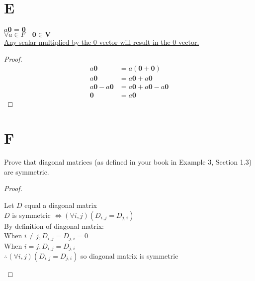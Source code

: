 \documentclass[11pt]{scrartcl}
\makeatletter
\newenvironment{Dequation}
  {%
  \def\tagform@##1{%
    \maketag@@@{\makebox[0pt][r]{(\ignorespaces##1\unskip\@@italiccorr)}}}%
  \ignorespaces
  }
  {%
  \def\tagform@##1{\maketag@@@{(\ignorespaces##1\unskip\@@italiccorr)}}%
  \ignorespacesafterend
  }
\makeatother
\begin{document}
\section{E}
\begin{theorem*}
			{$a\textbf{0 = 0}$ \\ $\forall a \in F \quad \textbf{0} \in \textbf{V}$ \\ \ul{Any scalar multiplied by the 0 vector will result in the 0 vector.}}
\end{theorem*}
\begin{proof}
\begin{Dequation}
\begin{align*}
	a \textbf{0} & = a(\textbf{0} + \textbf{0}) \tag{Identity element of addition} \\ 
	a \textbf{0} & = a\textbf{0} + a\textbf{0} \tag{Distributive} \\ 
	a \textbf{0} - a \textbf{0} & = a\textbf{0} + a\textbf{0} - a\textbf{0} \tag{Inverse element of addition} \\ 
	\textbf{0} & = a \textbf{0}
\end{align*}
\end{Dequation}
\end{proof}

\section{F}
Prove that diagonal matrices (as defined in your book in Example 3, Section 1.3) are symmetric.

\begin{proof}
	\-\
	\begin{center}
	Let $D$ equal a diagonal matrix \\
	$D$ is symmetric $\Leftrightarrow (\forall i,j)(D_{i,j} = D_{j,i})$\\
	By definition of diagonal matrix:\\
	When $i \neq j, D_{i,j} = D_{j,i} = 0$\\
	When $i = j, D_{i,j} = D_{j,i}$\\
	$\therefore (\forall i,j)(D_{i,j} = D_{j,i})$ so diagonal matrix is symmetric
\end{center}
\end{proof}
\end{document}
